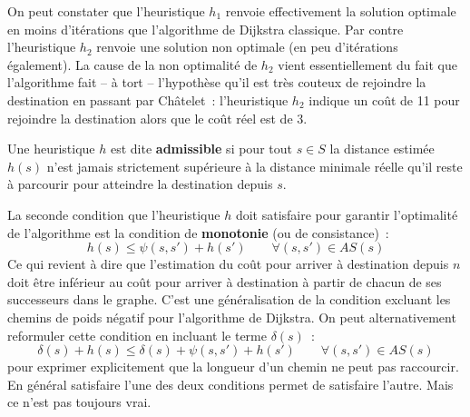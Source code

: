 \documentclass[11pt,openany]{book}
\newcommand{\kw}[1]{{\bf #1}} %
\begin{document}
\begin{center}
\end{center}
On peut constater que l'heuristique $h_1$ renvoie effectivement la solution
optimale en moins d'itérations que l'algorithme de Dijkstra
classique. 
Par contre l'heuristique $h_2$ renvoie une solution non
optimale (en peu d'itérations également).
La cause de la non optimalité de $h_2$ vient essentiellement du fait que l'algorithme
fait -- à tort -- l'hypothèse qu'il est très couteux de rejoindre la
destination en passant par Châtelet~: l'heuristique $h_2$ indique un coût de
11 pour rejoindre la destination alors que le coût réel est de 3.

Une heuristique $h$ est dite \kw{admissible} si pour tout $s\in S$ 
la distance estimée $h(s)$ n'est jamais strictement supérieure à la distance
minimale réelle qu'il reste à parcourir pour atteindre la destination
depuis $s$.

La seconde condition que l'heuristique $h$ doit 
satisfaire pour garantir l'optimalité de l'algorithme est la condition
de \kw{monotonie} (ou de consistance)~:
\begin{displaymath} 
h(s) \leq \psi(s,s') + h(s') \qquad \forall (s,s') \in AS(s) 
\end{displaymath}
Ce qui revient à dire que l'estimation du coût pour arriver à
destination depuis $n$ doit être inférieur au coût pour arriver à
destination à partir de chacun de ses successeurs dans le graphe. C'est une
généralisation de la condition excluant les chemins de poids négatif
pour l'algorithme de Dijkstra. On peut alternativement reformuler
cette condition en incluant le terme $\delta(s)$~:
\begin{displaymath} 
\delta(s) + h(s) \leq \delta(s) + \psi(s,s') + h(s') \qquad \forall (s,s') \in AS(s) 
\end{displaymath}
pour exprimer explicitement que la longueur d'un chemin ne peut pas
raccourcir.
En général satisfaire l'une des deux conditions permet de satisfaire
l'autre. Mais ce n'est pas toujours vrai.
\end{document}
